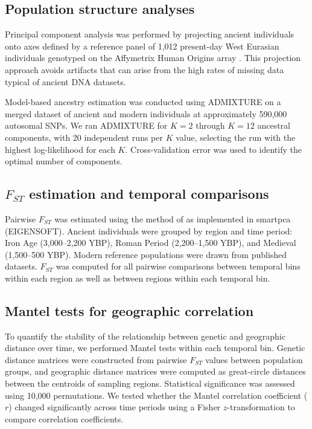 \documentclass[11pt,a4paper]{article}
\begin{document}
\subsection{Population structure analyses}
Principal component analysis was performed by projecting ancient individuals onto axes defined by a reference panel of 1,012 present-day West Eurasian individuals genotyped on the Affymetrix Human Origins array \citep{lazaridis2014ancient}. This projection approach avoids artifacts that can arise from the high rates of missing data typical of ancient DNA datasets.

Model-based ancestry estimation was conducted using ADMIXTURE \citep{alexander2009fast} on a merged dataset of ancient and modern individuals at approximately 590,000 autosomal SNPs. We ran ADMIXTURE for $K = 2$ through $K = 12$ ancestral components, with 20 independent runs per $K$ value, selecting the run with the highest log-likelihood for each $K$. Cross-validation error was used to identify the optimal number of components.

\subsection{$F_{ST}$ estimation and temporal comparisons}
Pairwise $F_{ST}$ was estimated using the method of \citet{weir1984estimating} as implemented in smartpca (EIGENSOFT). Ancient individuals were grouped by region and time period: Iron Age (3,000--2,200 YBP), Roman Period (2,200--1,500 YBP), and Medieval (1,500--500 YBP). Modern reference populations were drawn from published datasets. $F_{ST}$ was computed for all pairwise comparisons between temporal bins within each region as well as between regions within each temporal bin.

\subsection{Mantel tests for geographic correlation}
To quantify the stability of the relationship between genetic and geographic distance over time, we performed Mantel tests \citep{mantel1967detection} within each temporal bin. Genetic distance matrices were constructed from pairwise $F_{ST}$ values between population groups, and geographic distance matrices were computed as great-circle distances between the centroids of sampling regions. Statistical significance was assessed using 10,000 permutations. We tested whether the Mantel correlation coefficient ($r$) changed significantly across time periods using a Fisher $z$-transformation to compare correlation coefficients.
\end{document}
